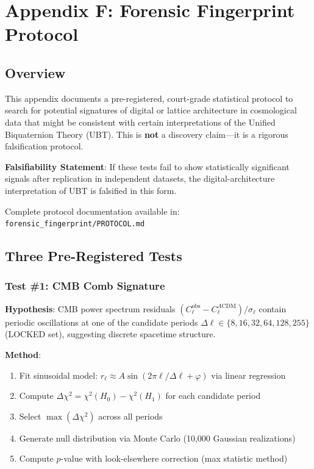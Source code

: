 

\section{Appendix F: Forensic Fingerprint Protocol}
\label{app:forensic_fingerprint}

\subsection{Overview}

This appendix documents a pre-registered, court-grade statistical protocol to search for potential signatures of digital or lattice architecture in cosmological data that might be consistent with certain interpretations of the Unified Biquaternion Theory (UBT). This is \textbf{not} a discovery claim—it is a rigorous falsification protocol.

\textbf{Falsifiability Statement}: If these tests fail to show statistically significant signals after replication in independent datasets, the digital-architecture interpretation of UBT is falsified in this form.

Complete protocol documentation available in: \texttt{forensic\_fingerprint/PROTOCOL.md}

\subsection{Three Pre-Registered Tests}

\subsubsection{Test \#1: CMB Comb Signature}

\textbf{Hypothesis}: CMB power spectrum residuals $(C_\ell^{\text{obs}} - C_\ell^{\Lambda\text{CDM}}) / \sigma_\ell$ contain periodic oscillations at one of the candidate periods $\Delta\ell \in \{8, 16, 32, 64, 128, 255\}$ (LOCKED set), suggesting discrete spacetime structure.

\textbf{Method}:
\begin{enumerate}
    \item Fit sinusoidal model: $r_\ell \approx A \sin(2\pi\ell/\Delta\ell + \varphi)$ via linear regression
    \item Compute $\Delta\chi^2 = \chi^2(H_0) - \chi^2(H_1)$ for each candidate period
    \item Select $\max(\Delta\chi^2)$ across all periods
    \item Generate null distribution via Monte Carlo (10,000 Gaussian realizations)
    \item Compute $p$-value with look-elsewhere correction (max statistic method)
\end{enumerate}

